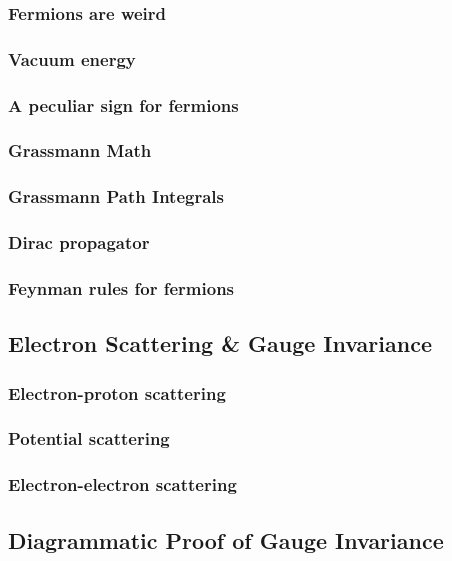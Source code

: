 \documentclass{book}
\theoremstyle{definition}
\begin{document}
\subsubsection{Fermions are weird}
\subsubsection{Vacuum energy}
\subsubsection{A peculiar sign for fermions}
\subsubsection{Grassmann Math}
\subsubsection{Grassmann Path Integrals}
\subsubsection{Dirac propagator}
\subsubsection{Feynman rules for fermions}

\newpage

\subsection{Electron Scattering \& Gauge Invariance}

\subsubsection{Electron-proton scattering}
\subsubsection{Potential scattering}
\subsubsection{Electron-electron scattering}

\newpage


\subsection{Diagrammatic Proof of Gauge Invariance}
\end{document}
